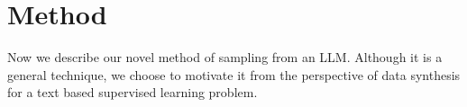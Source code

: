 \section{Method}
\label{sec:method}
Now we describe our novel \corrsyn{} method of sampling from an LLM. Although it is a general technique, we choose to motivate it from the perspective of data synthesis for a text based supervised learning problem. %




